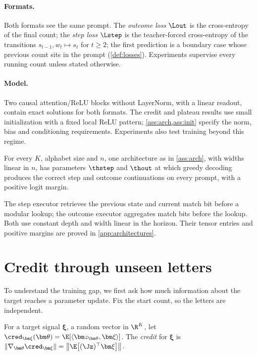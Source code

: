 \paragraph{Formats.} Both formats see the same prompt. The \emph{outcome loss} $\Lout$ is the cross-entropy of the final
count; the \emph{step loss} $\Lstep$ is the teacher-forced cross-entropy of the transitions $s_{t-1},w_t\mapsto s_t$ for
$t\ge2$; the first prediction is a boundary case whose previous count sits in the prompt (\cref{def:losses}). Experiments
supervise every running count unless stated otherwise.

\paragraph{Model.} Two causal attention/ReLU blocks without LayerNorm, with a linear readout,
contain exact solutions for both formats. The credit and plateau results use small initialization
with a fixed local ReLU pattern; \cref{ass:arch,ass:init} specify the norm, bias and conditioning
requirements. Experiments also test training beyond this regime.

\begin{proposition}
\label{prop:represent}
For every $K$, alphabet size and $n$, one architecture as in \cref{ass:arch}, with widths linear in $n$, has parameters
$\thstep$ and $\thout$ at which greedy decoding produces the correct step and outcome continuations on every prompt, with
a positive logit margin.
\end{proposition}

The step executor retrieves the previous state and current match bit before a modular lookup;
the outcome executor aggregates match bits before the lookup. Both use constant depth and width
linear in the horizon. Their tensor entries and positive margins are proved in \cref{app:architectures}.

\section{Credit through unseen letters}
\label{sec:credit}

To understand the training gap, we first ask how much information about the target reaches a parameter update.
Fix the start count, so the letters are independent.

\begin{definition}[Credit]
\label{def:credit}
For a target signal $\bm\xi$, a random vector in $\R^K$, let $\cred_{\bm\xi}(\bm\theta)=\E[\langle\bm z_{\bm\theta},\bm\xi\rangle]$. The
\emph{credit} for $\bm\xi$ is $\|\nabla_{\bm\theta}\cred_{\bm\xi}\|=\bigl\|\E\bigl[(\Jz)^\top\bm\xi\bigr]\bigr\|$.
\end{definition}

